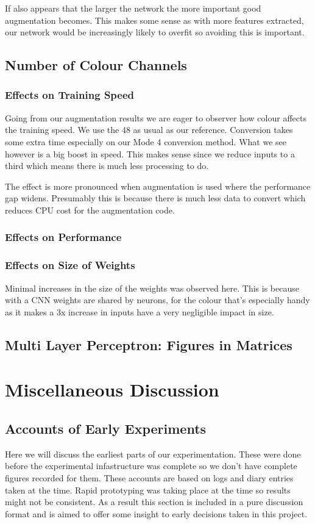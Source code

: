 If also appears that the larger the network the more important good augmentation becomes. This makes some sense as with more features extracted, our network would be increasingly likely to overfit so avoiding this is important.

\subsection{Number of Colour Channels}
\subsubsection{Effects on Training Speed}
Going from our augmentation results we are eager to observer how colour affects the training speed. We use the 48 as usual as our reference. Conversion takes some extra time especially on our Mode 4 conversion method. What we see however is a big boost in speed. This makes sense since we reduce inputs to a third which means there is much less processing to do.

The effect is more pronounced when augmentation is used where the performance gap widens. Presumably this is because there is much less data to convert which reduces CPU cost for the augmentation code.
\subsubsection{Effects on Performance}
\subsubsection{Effects on Size of Weights}
Minimal increases in the size of the weights was observed here. This is because with a CNN weights are shared by neurons, for the colour that's especially handy as it makes a 3x increase in inputs have a very negligible impact in size.

\subsection{Multi Layer Perceptron: Figures in Matrices}

\section{Miscellaneous Discussion}
\subsection{Accounts of Early Experiments}
Here we will discuss the earliest parts of our experimentation. These were done before the experimental infastructure was complete so we don't have complete figures recorded for them. These accounts are based on logs and diary entries taken at the time. Rapid prototyping was taking place at the time so results might not be consistent. As a result this section is included in a pure discussion format and is aimed to offer some insight to early decisions taken in this project.

